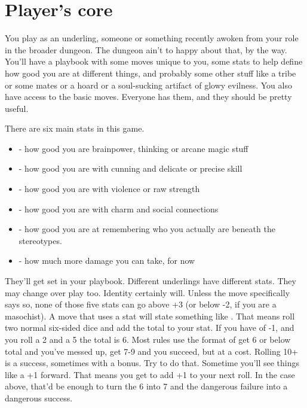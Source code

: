 \documentclass{tufte-book}
\begin{document}
\chapter{Player's core}

You play as an underling, someone or something recently awoken from your role in the broader dungeon. The dungeon ain't to happy about that, by the way. You'll have a playbook with some moves unique to you, some stats to help define how good you are at different things, and probably some other stuff like a tribe or some mates or a hoard or a soul-sucking artifact of glowy evilness. You also have access to the basic moves. Everyone has them, and they should be pretty useful.

There are six main stats in this game.
\begin{enumerate}
\begin{itemize}
\item {} - how good you are brainpower, thinking or arcane magic stuff
\item {} - how good you are with cunning and delicate or precise skill
\item {} - how good you are with violence or raw strength
\item {} - how good you are with charm and social connections
\item {} - how good you are at remembering who you actually are beneath the stereotypes.
\item {} - how much more damage you can take, for now
\end{itemize}
\end{enumerate}

They'll get set in your playbook. Different underlings have different stats. They may change over play too. Identity certainly will. Unless the move specifically says so, none of those five stats can go above +3 (or below -2, if you are a masochist). A move that uses a stat will state something like . That means roll two  normal six-sided dice and add the total to your stat. If you have  of -1, and you roll a 2 and a 5 the total is 6. Most rules use the format of get 6 or below total and you've messed up, get 7-9 and you succeed, but at a cost. Rolling 10+ is a success, sometimes with a bonus. Try to do that.
Sometime you'll see things like a +1 forward. That means you get to add +1 to your next roll. In the case above, that'd be enough to turn the 6 into 7 and the dangerous failure into a dangerous success.
\end{document}
